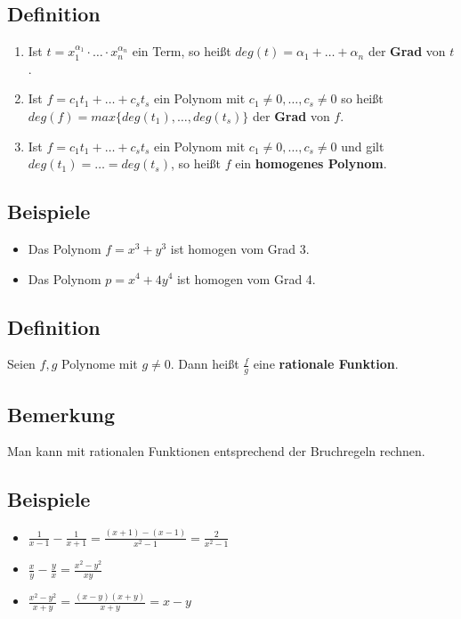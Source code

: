 \subsection[Der Grad]{Definition}

	\begin{enumerate}
	\item Ist $t=x_1^{\alpha_1}\cdot \ldots \cdot x_n^{\alpha_n}$ ein Term, so heißt 
	$deg(t)= \alpha_1+ \ldots +\alpha_n$ der \textbf{Grad} von $t$.
	
	\item Ist $f=c_1 t_1 + \ldots + c_s t_s$ ein Polynom mit $c_1 \neq 0, \ldots , c_s \neq 0$ so heißt
	$deg(f)=max\{deg(t_1), \ldots , deg(t_s) \}$ der \textbf{Grad} von $f$.
	
	
	\item Ist $f=c_1 t_1 + \ldots + c_s t_s$ ein Polynom mit $c_1 \neq 0, \ldots , c_s \neq 0$ und gilt
	$deg(t_1)=\ldots=deg(t_s)$, so heißt $f$ ein \textbf{homogenes Polynom}.	
	
	\end{enumerate}


\subsection{Beispiele}

	\begin{itemize}
	\item Das Polynom $f=x^3+y^3$ ist homogen vom Grad 3. 
	\item Das Polynom $p=x^4+4y^4$ ist homogen vom Grad 4.
	
	\end{itemize}
	
	
\subsection[Rationale Funktion]{Definition}

	Seien $f,g$ Polynome mit $g \neq 0$. Dann heißt $\frac{f}{g}$ eine \textbf{rationale Funktion}.
	
	
\subsection{Bemerkung}

	Man kann mit rationalen Funktionen entsprechend der Bruchregeln rechnen.
	
	
\subsection{Beispiele}

	\begin{itemize}
	\item $\frac{1}{x-1}-\frac{1}{x+1}= \frac{(x+1)-(x-1)}{x^2-1}=\frac{2}{x^2-1}$
	\item $\frac{x}{y}-\frac{y}{x}=\frac{x^2-y^2}{xy}$
	\item $\frac{x^2-y^2}{x+y}=\frac{(x-y)(x+y)}{x+y}=x-y$
	\end{itemize}
